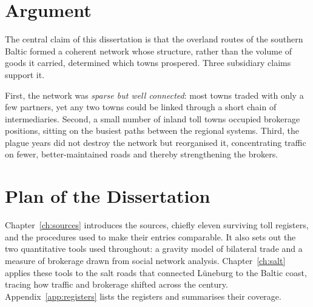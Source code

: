 \section{Argument}

The central claim of this dissertation is that the overland routes of the southern Baltic formed a coherent network whose structure, rather than the volume of goods it carried, determined which towns prospered. Three subsidiary claims support it.

First, the network was \emph{sparse but well connected}: most towns traded with only a few partners, yet any two towns could be linked through a short chain of intermediaries. Second, a small number of inland toll towns occupied brokerage positions, sitting on the busiest paths between the regional systems. Third, the plague years did not destroy the network but reorganised it, concentrating traffic on fewer, better-maintained roads and thereby strengthening the brokers.

\section{Plan of the Dissertation}

Chapter~\ref{ch:sources} introduces the sources, chiefly eleven surviving toll registers, and the procedures used to make their entries comparable. It also sets out the two quantitative tools used throughout: a gravity model of bilateral trade and a measure of brokerage drawn from social network analysis. Chapter~\ref{ch:salt} applies these tools to the salt roads that connected Lüneburg to the Baltic coast, tracing how traffic and brokerage shifted across the century. Appendix~\ref{app:registers} lists the registers and summarises their coverage.
